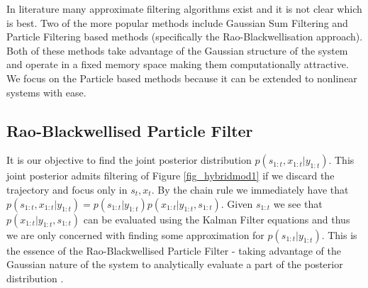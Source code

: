 \documentclass[../masters.tex]{subfiles}
\begin{document}
In literature many approximate filtering algorithms exist and it is not clear which is best. Two of the more popular methods include Gaussian Sum Filtering \cite{barber2} and Particle Filtering based methods (specifically the Rao-Blackwellisation approach). Both of these methods take advantage of the Gaussian structure of the system and operate in a fixed memory space making them computationally attractive. We focus on the Particle based methods because it can be extended to nonlinear systems with ease.   

\subsection{Rao-Blackwellised Particle Filter}
It is our objective to find the joint posterior distribution $p(s_{1:t}, x_{1:t}|y_{1:t})$. This joint posterior admits filtering of Figure \ref{fig_hybridmod1} if we discard the trajectory and focus only in $s_t,x_t$. By the chain rule we immediately have that $p(s_{1:t}, x_{1:t}|y_{1:t}) = p(s_{1:t}|y_{1:t})p(x_{1:t}|y_{1:t}, s_{1:t})$. Given $s_{1:t}$ we see that $p(x_{1:t}|y_{1:t}, s_{1:t})$ can be evaluated using the Kalman Filter equations and thus we are only concerned with finding some approximation for $p(s_{1:t}|y_{1:t})$. This is the essence of the Rao-Blackwellised Particle Filter - taking advantage of the Gaussian nature of the system to analytically evaluate a part of the posterior distribution \cite{doucet}.
\end{document}
